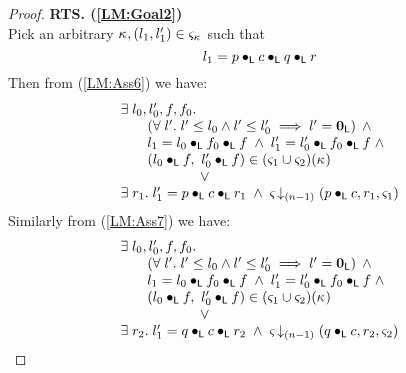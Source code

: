 \begin{lemma}[]
\begin{proof}
\noindent\textbf{RTS. (\ref{LM:Goal2})}\\
Pick an arbitrary $\kappa_{}, (l_1, l'_1) \in \varsigma_{\kappa_{}}$ such that 
%
\begin{equation}
	l_1 = p \bullet_{\textsf{L}} c \bullet_{\textsf{L}} q \bullet_{\textsf{L}} r \label{LM:Ass28}
\end{equation}
Then from (\ref{LM:Ass6}) we have:
%
\begin{align}
	\begin{array}{l}
		\exsts{l_0, l'_0, f, f_0} \\
	  \hspace*{0.5cm}
	  \begin{array}{l}
	  	\left(\for{l'} l' \leq l_0 \land l' \leq l'_0 \implies l' = \unitL\right)\;\land\\
	  	l_1 = l_0 \composeL f_0 \composeL f \;\land\; l'_1 = l'_0 \composeL f_0 \composeL f   \;\land\\
	  	(l_0 \composeL f,\ l'_0 \composeL f) \in (\amod{1} \cup \amod{2})(\ca{}) 
	  \end{array} \\
%
		\hspace*{2cm}\lor  \\
		\exsts{r_1} l'_1 = p \composeL c \composeL r_1 \;\land\; \extendsAMUpto{\amod}{(n-1)}{p \composeL c}{r_1}{\amod{1}}
	\end{array} \label{LM:Ass29}
\end{align}
%
Similarly from (\ref{LM:Ass7}) we have:
%
\begin{align}
	\begin{array}{l}
		\exsts{l_0, l'_0, f, f_0} \\
	  \hspace*{0.5cm}
	  \begin{array}{l}
	  	\left(\for{l'} l' \leq l_0 \land l' \leq l'_0 \implies l' = \unitL\right)\;\land\\
	  	l_1 = l_0 \composeL f_0 \composeL f \;\land\; l'_1 = l'_0 \composeL f_0 \composeL f   \;\land\\
	  	(l_0 \composeL f,\ l'_0 \composeL f) \in (\amod{1} \cup \amod{2})(\ca{}) 
	  \end{array} \\
%
		\hspace*{2cm}\lor  \\
		\exsts{r_2} l'_1 = q \composeL c \composeL r_2 \;\land\; \extendsAMUpto{\amod}{(n-1)}{q \composeL c}{r_2}{\amod{2}}
	\end{array} \label{LM:Ass30}
\end{align}

\end{proof}
\end{lemma}
